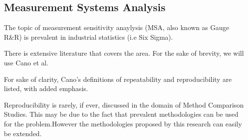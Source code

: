 \documentclass[]{article}
\begin{document}
\subsection*{Measurement Systems Analysis}The topic of measurement sensitivity anaylysis (MSA, also known as Gauge R\&R) is prevalent in industrial statistics (i.e Six Sigma).

There is extensive literature that covers the area. For the sake of brevity, we will use Cano et al.

For sake of clarity, Cano's definitions of repeatability and reproducibility are listed, with added emphasis.

Reproducibility is rarely, if ever, discussed in the domain of Method Comparison Studies. This may be due to the fact that prevalent methodologies can be used for the problem.However
the methodologies proposed by this research can easily be extended.





\end{document}

